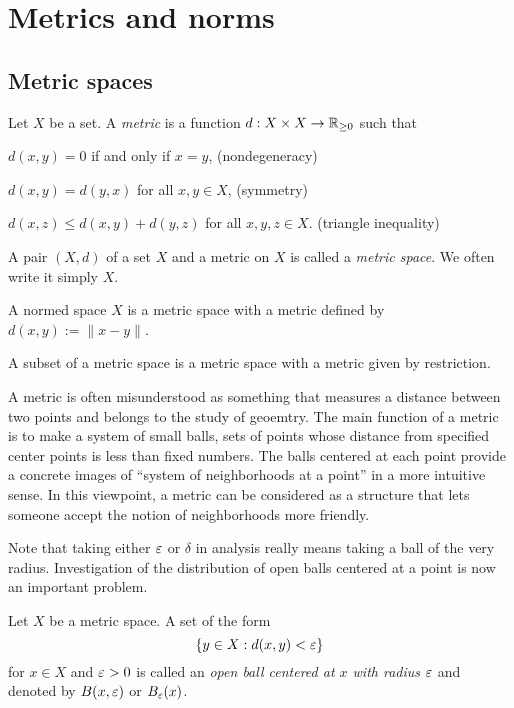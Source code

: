 \documentclass{../note}
\begin{document}
\chapter{Metrics and norms}
\section{Metric spaces}
\begin{prb}
Let $X$ be a set.
A \emph{metric} is a function $d:X\times X\to\mathbb{R}_{\ge0}$ such that
\begin{parts}[(i)]
\item $d(x,y)=0$ if and only if $x=y$, \hfill(nondegeneracy)
\item $d(x,y)=d(y,x)$ for all $x,y\in X$, \hfill(symmetry)
\item $d(x,z)\le d(x,y)+d(y,z)$ for all $x,y,z\in X$. \hfill(triangle inequality)
\end{parts}
A pair $(X,d)$ of a set $X$ and a metric on $X$ is called a \emph{metric space}.
We often write it simply $X$.
\begin{parts}
\item
A normed space $X$ is a metric space with a metric defined by $d(x,y):=\|x-y\|$.
\item
A subset of a metric space is a metric space with a metric given by restriction.
\end{parts}
\end{prb}

\begin{prb}
A metric is often misunderstood as something that measures a distance between two points and belongs to the study of geoemtry.
The main function of a metric is to make a system of small balls, sets of points whose distance from specified center points is less than fixed numbers.
The balls centered at each point provide a concrete images of ``system of neighborhoods at a point'' in a more intuitive sense.
In this viewpoint, a metric can be considered as a structure that lets someone accept the notion of neighborhoods more friendly.

Note that taking either $\varepsilon$ or $\delta$ in analysis really means taking a ball of the very radius.
Investigation of the distribution of open balls centered at a point is now an important problem.

Let $X$ be a metric space.
A set of the form 
\[\{y\in X:d(x,y)<\varepsilon\}\]
for $x\in X$ and $\varepsilon>0$ is called an \emph{open ball centered at $x$ with radius $\varepsilon$} and denoted by $B(x,\varepsilon)$ or $B_\varepsilon(x)$.
\end{prb}
\end{document}
